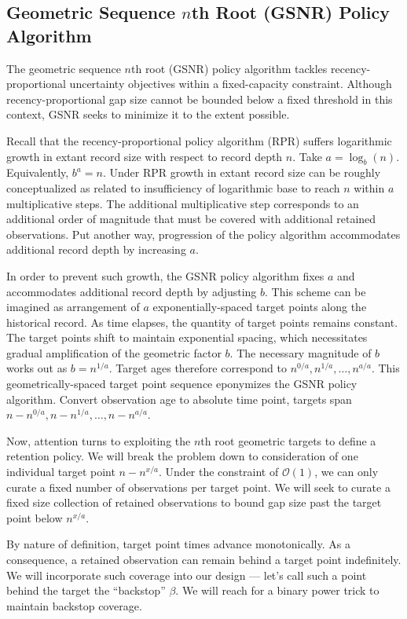 \subsection{Geometric Sequence $n$th Root (GSNR) Policy Algorithm}
\label{sec:geom-seq-nth-root-algo}

The geometric sequence $n$th root (GSNR) policy algorithm tackles recency-proportional uncertainty objectives within a fixed-capacity constraint.
Although recency-proportional gap size cannot be bounded below a fixed threshold in this context, GSNR seeks to minimize it to the extent possible.

Recall that the recency-proportional policy algorithm (RPR) suffers logarithmic growth in extant record size with respect to record depth $n$.
Take $a = \log_b(n)$.
Equivalently, $b^a = n$.
Under RPR growth in extant record size can be roughly conceptualized as related to insufficiency of logarithmic base to reach $n$ within $a$ multiplicative steps.
The additional multiplicative step corresponds to an additional order of magnitude that must be covered with additional retained observations.
Put another way, progression of the policy algorithm accommodates additional record depth by increasing $a$.

In order to prevent such growth, the GSNR policy algorithm fixes $a$ and accommodates additional record depth by adjusting $b$.
This scheme can be imagined as arrangement of $a$ exponentially-spaced target points along the historical record.
As time elapses, the quantity of target points remains constant.
The target points shift to maintain exponential spacing, which necessitates gradual amplification of the geometric factor $b$.
The necessary magnitude of $b$ works out as $b = n^{1/a}$.
Target ages therefore correspond to $n^{0/a}, n^{1/a}, \ldots, n^{a/a}$.
This geometrically-spaced target point sequence eponymizes the GSNR policy algorithm.
Convert observation age to absolute time point, targets span $n - n^{0/a}, n - n^{1/a}, \ldots, n - n^{a/a}$.

Now, attention turns to exploiting the $n$th root geometric targets to define a retention policy.
We will break the problem down to consideration of one individual target point $n - n^{x/a}$.
Under the constraint of $\mathcal{O}(1)$, we can only curate a fixed number of observations per target point.
We will seek to curate a fixed size collection of retained observations to bound gap size past the target point below $n^{x/a}$.

By nature of definition, target point times advance monotonically.
As a consequence, a retained observation can remain behind a target point indefinitely.
We will incorporate such coverage into our design --- let's call such a point behind the target the ``backstop'' $\beta$.
We will reach for a binary power trick to maintain backstop coverage.

